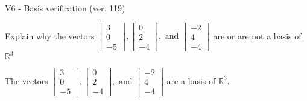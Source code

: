 \begin{exercise}
  \begin{exerciseTitle}V6 - Basis verification (ver. 119)\end{exerciseTitle}
  \begin{exerciseStatement}
    Explain why the vectors \(\left[\begin{array}{r}
3 \\
0 \\
-5
\end{array}\right] , \left[\begin{array}{r}
0 \\
2 \\
-4
\end{array}\right] , \text{ and } \left[\begin{array}{r}
-2 \\
4 \\
-4
\end{array}\right]\) are or are not a basis of \(\mathbb{R}^3\)	


  \end{exerciseStatement}
  \begin{exerciseAnswer}
   The vectors \(\left[\begin{array}{r}
3 \\
0 \\
-5
\end{array}\right] , \left[\begin{array}{r}
0 \\
2 \\
-4
\end{array}\right] , \text{ and } \left[\begin{array}{r}
-2 \\
4 \\
-4
\end{array}\right]\) 
  	 are  a basis of \(\mathbb{R}^3\).
  


  \end{exerciseAnswer}
\end{exercise}